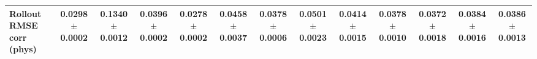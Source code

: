 \begin{table}[t]
{\begin{tabular}{lcccccccccccc}
Rollout RMSE corr (phys) & \makecell{0.0298\\[-2pt]{\scriptsize$\pm$0.0002}} & \makecell{0.1340\\[-2pt]{\scriptsize$\pm$0.0012}} & \makecell{0.0396\\[-2pt]{\scriptsize$\pm$0.0002}} & \makecell{\textbf{0.0278}\\[-2pt]{\scriptsize$\pm$0.0002}} & \makecell{0.0458\\[-2pt]{\scriptsize$\pm$0.0037}} & \makecell{0.0378\\[-2pt]{\scriptsize$\pm$0.0006}} & \makecell{0.0501\\[-2pt]{\scriptsize$\pm$0.0023}} & \makecell{0.0414\\[-2pt]{\scriptsize$\pm$0.0015}} & \makecell{0.0378\\[-2pt]{\scriptsize$\pm$0.0010}} & \makecell{0.0372\\[-2pt]{\scriptsize$\pm$0.0018}} & \makecell{0.0384\\[-2pt]{\scriptsize$\pm$0.0016}} & \makecell{0.0386\\[-2pt]{\scriptsize$\pm$0.0013}} \\
\bottomrule
\end{tabular}}
\end{table}